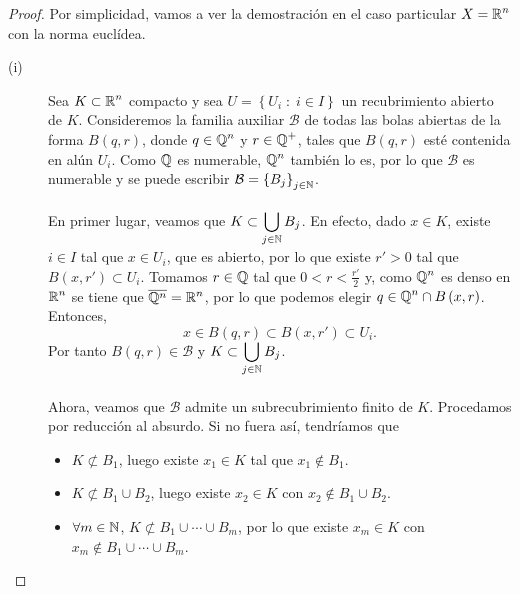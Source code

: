 \begin{proof}
Por simplicidad, vamos a ver la demostración en el caso particular $\displaystyle X = \mathbb{R}^{n} $ con la norma euclídea. 
\begin{description}
	\item[(i)] Sea $\displaystyle K \subset \mathbb{R}^{n} $ compacto y sea $\displaystyle U = \left\{ U_{i} \; : \; i \in I\right\}  $ un recubrimiento abierto de $\displaystyle K $. Consideremos la familia auxiliar $\displaystyle \mathcal{B}  $ de todas las bolas abiertas de la forma $\displaystyle B\left(q,r\right) $, donde $\displaystyle q \in \mathbb{Q}^{n} $ y $\displaystyle r \in \mathbb{Q}^{+} $, tales que $\displaystyle B\left(q,r\right) $ esté contenida en alún $\displaystyle U_{i} $. Como $\displaystyle \mathbb{Q} $ es numerable, $\displaystyle \mathbb{Q}^{n} $ también lo es, por lo que $\displaystyle \mathcal{B} $ es numerable y se puede escribir $\displaystyle \mathcal{B} = \left\{ B_{j}\right\}_{j \in \mathbb{N}} $. \\ \\
En primer lugar, veamos que $\displaystyle K \subset \bigcup_{j \in \mathbb{N}}B_{j} $. En efecto, dado $\displaystyle x \in K $, existe $\displaystyle i \in I $ tal que $\displaystyle x \in U_{i} $, que es abierto, por lo que existe $\displaystyle r' > 0 $ tal que $\displaystyle B\left(x,r'\right)\subset U_{i} $. Tomamos $\displaystyle r \in \mathbb{Q} $ tal que $\displaystyle 0 < r < \frac{r'}{2} $ y, como $\displaystyle \mathbb{Q}^{n} $ es denso en $\displaystyle \mathbb{R}^{n} $ se tiene que $\displaystyle \overline{\mathbb{Q}^{n}} = \mathbb{R}^{n} $, por lo que podemos elegir $\displaystyle q \in \mathbb{Q}^{n} \cap B\left(x,r\right) $. 
		Entonces, 
		\[ x \in B\left(q,r\right) \subset B\left(x,r'\right)\subset U_{i}.\]
		Por tanto $\displaystyle B\left(q,r\right) \in \mathcal{B} $ y $\displaystyle K \subset \bigcup_{j \in \mathbb{N}}B_{j} $. \\ \\
		Ahora, veamos que $\displaystyle \mathcal{B} $ admite un subrecubrimiento finito de $\displaystyle K $. Procedamos por reducción al absurdo. Si no fuera así, tendríamos que
		\begin{itemize}
		\item $\displaystyle K \not\subset B_{1} $, luego existe $\displaystyle x_{1} \in K $ tal que $\displaystyle x_{1} \not\in B_{1} $.
		\item $\displaystyle K \not\subset B_{1} \cup B_{2} $, luego existe $\displaystyle x_{2} \in K $ con $\displaystyle x_{2} \not\in B_{1} \cup B_{2} $.
		\item $\displaystyle \forall m \in \mathbb{N} $, $\displaystyle K \not \subset B_{1} \cup \cdots \cup B_{m} $, por lo que existe $\displaystyle x_{m} \in K $ con $\displaystyle x_{m} \not\in B_{1} \cup \cdots \cup B_{m} $. 

\end{itemize}
\end{description}
\end{proof}
